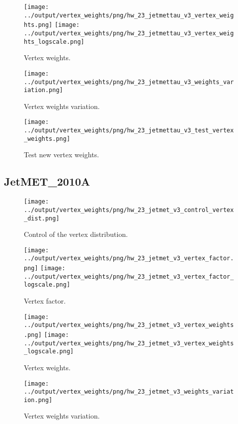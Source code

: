 \documentclass[11pt]{book}
\begin{document}
\begin{figure}[ht]
\centering
\texttt{[image: ../output/vertex\_weights/png/hw\_23\_jetmettau\_v3\_vertex\_weights.png]}
\texttt{[image: ../output/vertex\_weights/png/hw\_23\_jetmettau\_v3\_vertex\_weights\_logscale.png]}
\caption{Vertex weights.}
\end{figure}

\begin{figure}[ht]
\centering
\texttt{[image: ../output/vertex\_weights/png/hw\_23\_jetmettau\_v3\_weights\_variation.png]}
\caption{Vertex weights variation.}
\end{figure}

\begin{figure}[ht]
\centering
\texttt{[image: ../output/vertex\_weights/png/hw\_23\_jetmettau\_v3\_test\_vertex\_weights.png]}
\caption{Test new vertex weights.}
\end{figure}
\clearpage

\subsection{JetMET\_2010A}
\begin{figure}[ht]
\centering
\texttt{[image: ../output/vertex\_weights/png/hw\_23\_jetmet\_v3\_control\_vertex\_dist.png]}
\caption{Control of the vertex distribution.}
\end{figure}

\begin{figure}[ht]
\centering
\texttt{[image: ../output/vertex\_weights/png/hw\_23\_jetmet\_v3\_vertex\_factor.png]}
\texttt{[image: ../output/vertex\_weights/png/hw\_23\_jetmet\_v3\_vertex\_factor\_logscale.png]}
\caption{Vertex factor.}
\end{figure}

\begin{figure}[ht]
\centering
\texttt{[image: ../output/vertex\_weights/png/hw\_23\_jetmet\_v3\_vertex\_weights.png]}
\texttt{[image: ../output/vertex\_weights/png/hw\_23\_jetmet\_v3\_vertex\_weights\_logscale.png]}
\caption{Vertex weights.}
\end{figure}

\begin{figure}[ht]
\centering
\texttt{[image: ../output/vertex\_weights/png/hw\_23\_jetmet\_v3\_weights\_variation.png]}
\caption{Vertex weights variation.}
\end{figure}
\end{document}

